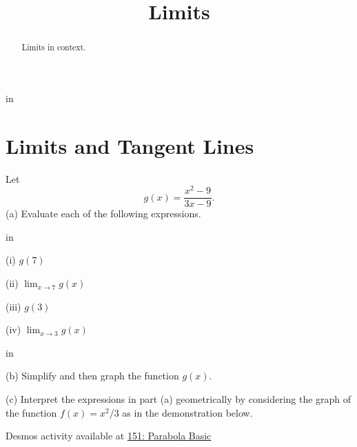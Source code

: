 \documentclass{ximera}
\title{Limits}
\newcommand{\pskip}{\vskip 0.1 in}
\begin{document}
\begin{abstract}
Limits in context.
\end{abstract}
\maketitle


\pskip

\section{Limits and Tangent Lines}

\begin{example}  \label{Ex:9uudfg9}
Let
\[
     g(x) = \frac{x^2-9}{3x-9} .
\]
(a) Evaluate each of the following expressions.

\pskip

(i) $g(7)$

(ii) $\lim_{x\to 7} g(x)$

(iii) $g(3)$

(iv) $\lim_{x\to 3} g(x)$

\pskip

(b) Simplify and then graph the function $g(x)$.

(c) Interpret the expressions in part (a) geometrically by considering the graph of the function $f(x)=x^2/3$ as in the demonstration below.

\begin{onlineOnly}
    \begin{center}
\end{center}
\end{onlineOnly}

Desmos activity available at
\href{https://www.desmos.com/calculator/u0uvuchnrk}{151: Parabola Basic}

\end{example}
\end{document}
